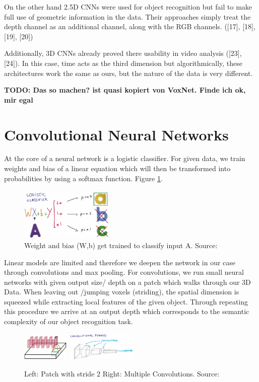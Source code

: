 \documentclass[10pt,twocolumn,letterpaper]{article}
\begin{document}
On the other hand 2.5D CNNs were used for object recognition but fail to make full use of geometric information in the data. Their approaches simply treat the depth channel as an additional channel, along with the RGB channels. ([17], [18], [19], [20]) 

Additionally, 3D CNNs already proved there usability in video analysis ([23], [24]). In this case, time acts as the third dimension but algorithmically, these architectures work the same as ours, but the nature of the data is very different.

\textbf{TODO: Das so machen? ist quasi kopiert von VoxNet. Finde ich ok, mir egal}

\section{Convolutional Neural Networks}

At the core of a neural network is a logistic classifier. 
For given data, we train weights and bias of a linear equation which will then be transformed into 
probabilities by using a softmax function. Figure \ref{fig:classifier}.

\begin{figure}[h]
	\label{fig:classifier}
	\centering
	\includegraphics[width=0.4\textwidth]{figures/classifier}
	\caption{Weight and bias (W,b) get trained to classify input A. Source: \cite{udacity}}
\end{figure}

Linear models are limited and therefore we deepen the network in our case through convolutions and max pooling.
For convolutions, we run small neural networks with given output size/ depth on a patch which walks through our 3D Data. When leaving out /jumping voxels (striding),
the spatial dimension is squeezed while extracting local features of the given object. 
Through repeating this procedure we arrive at an output depth which corresponds to the semantic complexity of our object recognition task. 

\begin{figure}[h]
	\label{fig:convolution}
	\includegraphics[width=0.2\textwidth]{figures/conv}
	\includegraphics[width=0.3\textwidth]{figures/pyra}
	\caption{Left: Patch with stride 2 \quad Right: Multiple Convolutions. Source: \cite{udacity}}
\end{figure}
\end{document}
